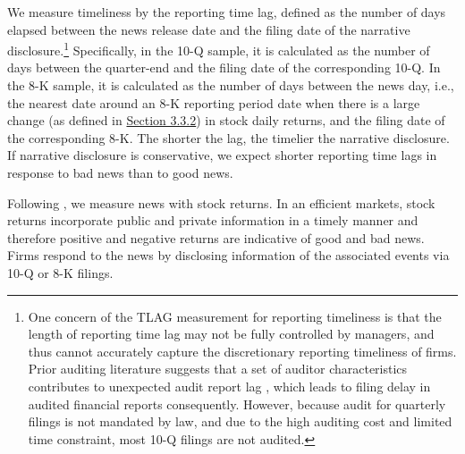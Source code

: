 \documentclass[letterpaper,11pt]{article}
\begin{document}
\begin{spacing}{1.5}
We measure timeliness by the reporting time lag, defined as the number of days elapsed between the news release date and the filing date of the narrative disclosure.\footnote{One concern of the TLAG measurement for reporting timeliness is that the length of reporting time lag may not be fully controlled by managers, and thus cannot accurately capture the discretionary reporting timeliness of firms. Prior auditing literature suggests that a set of auditor characteristics contributes to unexpected audit report lag \cite{knechelAdditionalEvidenceAudit2001, bamberAuditStructureOther1993}, which leads to filing delay in audited financial reports consequently. However, because audit for quarterly filings is not mandated by law, and due to the high auditing cost and limited time constraint, most 10-Q filings are not audited.} Specifically, in the 10-Q sample, it is calculated as the number of days between the quarter-end and the filing date of the corresponding 10-Q. In the 8-K sample, it is calculated as the number of days between the news day, i.e., the nearest date around an 8-K reporting period date when there is a large change (as defined in \hyperref[sec3.3.2]{Section 3.3.2}) in stock daily returns, and the filing date of the corresponding 8-K. The shorter the lag, the timelier the narrative disclosure. If narrative disclosure is conservative, we expect shorter reporting time lags in response to bad news than to good news.

Following , we measure news with stock returns. In an efficient markets, stock returns incorporate public and private information in a timely manner and therefore positive and negative returns are indicative of good and bad news. %
Firms respond to the news by disclosing information of the associated events via 10-Q or 8-K filings. 


\end{spacing}
\end{document}
